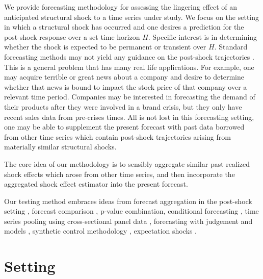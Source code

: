 \documentclass[11pt]{article}
\theoremstyle{definition}
\begin{document}
We provide forecasting methodology for assessing the lingering effect of an anticipated structural shock to a time series under study. We focus on the setting in which a structural shock has occurred and one desires a prediction for the post-shock response over a set time horizon $H$. Specific interest is in determining whether the shock is expected to be permanent or transient over $H$. Standard forecasting methods may not yield any guidance on the post-shock trajectories \citep{baumeister2014real}. 
This is a general problem that has many real life applications. For example, one may acquire terrible or great news about a company and desire to determine whether that news is bound to impact the stock price of that company over a relevant time period.  Companies may be interested in forecasting the demand of their products after they were involved in a brand crisis, but they only have recent sales data from pre-crises times. %
All is not lost in this forecasting setting, one may be able to supplement the present forecast with past data borrowed from other time series which contain post-shock trajectories arising from materially similar structural shocks.

The core idea of our methodology is to sensibly aggregate similar past realized shock effects which arose from other time series, and then incorporate the aggregated shock effect estimator into the present forecast.

Our testing method embraces ideas from 
forecast aggregation in the post-shock setting \citep{lin2021minimizing}, 
forecast comparison \citep{diebold1995comparing, quaedvlieg2021multi}, 
p-value combination, 
conditional forecasting \citep{baumeister2014real, kilian2017structural}, 
time series pooling using cross-sectional panel data \citep{ramaswamy1993empirical, pesaran1999pooled, hoogstrate2000pooling, baltagi2008forecasting, koop2012forecasting, liu2020forecasting},
forecasting with judgement and models \citep{svensson2005monetary, monti2008forecast}, 
synthetic control methodology \citep{abadie2010synthetic, agarwal2020two},  
expectation shocks \citep{croushore2006data, baumeister2014general, clements2019measuring}.




\section{Setting}
\end{document}
